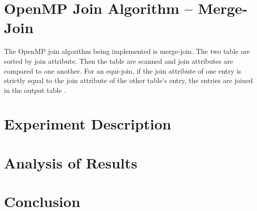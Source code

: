 \documentclass[journal,draftclsnofoot]{IEEEtran}
\begin{document}
\section{OpenMP Join Algorithm -- Merge-Join}\label{omp}
The OpenMP join algorithm being implemented is merge-join. The two table are sorted by join attribute. Then the table are scanned and join attributes are compared to one another. For an equi-join, if the join attribute of one entry is strictly equal to the join attribute of the other table's entry, the entries are joined in the output table \cite{Pavlo2017}.
\section{Experiment Description}\label{desc}
\section{Analysis of Results}\label{ana}
\section{Conclusion}\label{conc}


\cleardoublepage
\onecolumn
\end{document}

